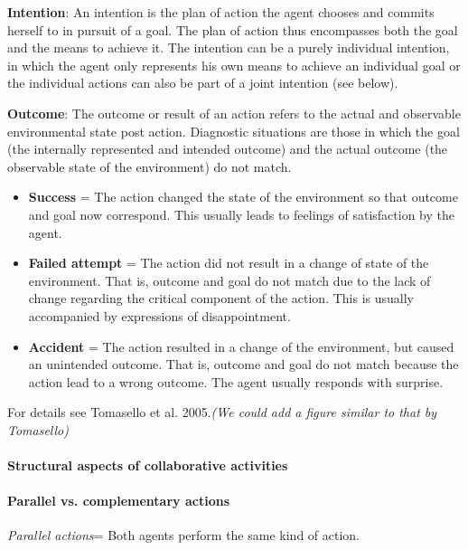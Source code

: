 \documentclass{article}
\begin{document}
\textbf{Intention}: An intention is the plan of action the agent chooses and
commits herself to in pursuit of a goal.  The plan of action thus encompasses
both the goal and the means to achieve it. The intention can be a purely
individual intention, in which the agent only represents his own means to
achieve an individual goal or the individual actions can also be part of a
joint intention (see below). 

\textbf{Outcome}: The outcome or result of an action refers to the actual and
observable environmental state post action. Diagnostic situations are those in
which the goal (the internally represented and intended outcome) and the actual
outcome (the observable state of the environment) do not match.

\begin{itemize}

\item \textbf{Success} = The action changed the state of the environment so that
outcome and goal now correspond.  This usually leads to feelings of
satisfaction by the agent.

\item \textbf{Failed attempt} = The action did not result in a change of state of the
environment. That is, outcome and goal do not match due to the lack of change
regarding the critical component of the action. This is usually accompanied by
expressions of disappointment.

\item \textbf{Accident} = The action resulted in a change of the environment, but
caused an unintended outcome. That is, outcome and goal do not match because
the action lead to a wrong outcome. The agent usually responds with surprise.

\end{itemize}

For details see Tomasello et al. 2005.\textit{(We could add a figure similar to
that by Tomasello)}

\paragraph{Structural aspects of collaborative activities}

\paragraph{Parallel vs. complementary actions}

\textit{Parallel actions}= Both agents perform the same kind of action.
\end{document}
